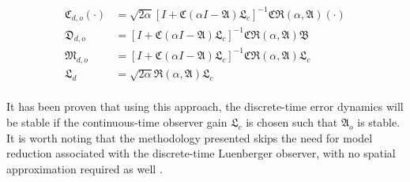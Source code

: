 \begin{equation} \label{eq:observer_discrete_CDLM}
    \begin{aligned}
        \mathfrak{C}_{d,o} (\cdot) &= \sqrt{2\alpha} \left[ I + \mathfrak{C} (\alpha I - \mathfrak{A}) \mathfrak{L}_c \right]^{-1} \mathfrak{C} \mathfrak{R}(\alpha, \mathfrak{A}) (\cdot) \\
        \mathfrak{D}_{d,o} &= \left[ I + \mathfrak{C} (\alpha I - \mathfrak{A}) \mathfrak{L}_c \right]^{-1} \mathfrak{C} \mathfrak{R}(\alpha, \mathfrak{A}) \mathfrak{B} \\
        \mathfrak{M}_{d,o} &= \left[ I + \mathfrak{C} (\alpha I - \mathfrak{A}) \mathfrak{L}_c \right]^{-1} \mathfrak{C} \mathfrak{R}(\alpha, \mathfrak{A}) \mathfrak{L}_c \\
        \mathfrak{L}_d &= \sqrt{2\alpha} \mathfrak{R}(\alpha, \mathfrak{A}) \mathfrak{L}_c \\
    \end{aligned}
\end{equation}

It has been proven that using this approach, the discrete-time error dynamics will be stable if the continuous-time observer gain $\mathfrak{L}_c$ is chosen such that $\mathfrak{A}_o$ is stable. It is worth noting that the methodology presented skips the need for model reduction associated with the discrete-time Luenberger observer, with no spatial approximation required as well \cite{dochain2000state,dochain2001state,alonso2004optimal,ali2015review,khatibi2021model}.